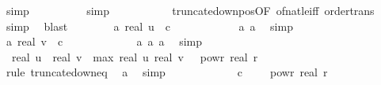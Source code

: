 \begin{isabellebody}
\ simp\isanewline
\ \ \ \ \ \ \ \ \isamarkupfalse%
\ simp\isanewline
\ \ \ \ \ \ \ \ \isamarkupfalse%
\ \ truncate{\isacharunderscore}{\kern0pt}down{\isacharunderscore}{\kern0pt}pos{\isacharbrackleft}{\kern0pt}OF\ of{\isacharunderscore}{\kern0pt}nat{\isacharunderscore}{\kern0pt}{}{\isacharunderscore}{\kern0pt}le{\isacharunderscore}{\kern0pt}iff{\isacharbrackright}{\kern0pt}\ order{\isacharunderscore}{\kern0pt}trans\ \isamarkupfalse%
\ simp\ \isamarkupfalse%
\ blast\isanewline
\isanewline
\ \ \ \ \ \ \isamarkupfalse%
\ a{\isacharunderscore}{\kern0pt}{}{\isacharcolon}{\kern0pt}\ {\isachardoublequoteopen}real\ u\ {\isasymle}\ c\ {\isacharasterisk}{\kern0pt}\ {}{\isachardoublequoteclose}\isanewline
\ \ \ \ \ \ \ \ \isamarkupfalse%
\ a{\isacharunderscore}{\kern0pt}{}\ a{\isacharunderscore}{\kern0pt}{}\ \isamarkupfalse%
\ simp\isanewline
\ \ \ \ \ \ \isamarkupfalse%
\ a{\isacharunderscore}{\kern0pt}{}{\isacharcolon}{\kern0pt}\ {\isachardoublequoteopen}real\ v\ {\isasymle}\ c\ {\isacharasterisk}{\kern0pt}\ {}{\isachardoublequoteclose}\ \isanewline
\ \ \ \ \ \ \ \ \isamarkupfalse%
\ a{\isacharunderscore}{\kern0pt}{}\ a{\isacharunderscore}{\kern0pt}{}\ a{\isacharunderscore}{\kern0pt}{}\ \isamarkupfalse%
\ simp\isanewline
\ \ \ \ \ \ \isamarkupfalse%
\ {\isachardoublequoteopen}\ {\isasymbar}real\ u\ {\isacharminus}{\kern0pt}\ real\ v{\isasymbar}\ {\isasymle}\ {\isacharparenleft}{\kern0pt}max\ {\isasymbar}real\ u{\isasymbar}\ {\isasymbar}real\ v{\isasymbar}{\isacharparenright}{\kern0pt}\ {\isacharasterisk}{\kern0pt}\ {}\ powr\ {\isacharparenleft}{\kern0pt}{\isacharminus}{\kern0pt}real\ r{\isacharparenright}{\kern0pt}{\isachardoublequoteclose}\isanewline
\ \ \ \ \ \ \ \ \isamarkupfalse%
\ {\isacharparenleft}{\kern0pt}rule\ truncate{\isacharunderscore}{\kern0pt}down{\isacharunderscore}{\kern0pt}eq{\isacharparenright}{\kern0pt}\ \isamarkupfalse%
\ a{\isacharunderscore}{\kern0pt}{}\ \isamarkupfalse%
\ simp\ \isanewline
\ \ \ \ \ \ \isamarkupfalse%
\ \isamarkupfalse%
\ {\isachardoublequoteopen}{\isachardot}{\kern0pt}{\isachardot}{\kern0pt}{\isachardot}{\kern0pt}\ {\isasymle}\ {\isacharparenleft}{\kern0pt}c\ {\isacharasterisk}{\kern0pt}\ {}{\isacharparenright}{\kern0pt}\ {\isacharasterisk}{\kern0pt}\ {}\ powr\ {\isacharparenleft}{\kern0pt}{\isacharminus}{\kern0pt}real\ r{\isacharparenright}{\kern0pt}{\isachardoublequoteclose}\isanewline

\end{isabellebody}
